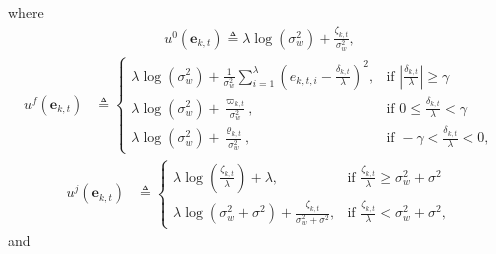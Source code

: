 \documentclass[onecolumn]{IEEEtran}
\begin{document}
where
\begin{gather}\label{eq:u0_rrr}
u^0(\mathbf{e}_{k,t}) \triangleq  \lambda \log(\sigma_w^2) + \frac{\zeta_{k,t}}{\sigma_w^2},
\end{gather}
\begin{align} \label{eq:uf_rrr}
u^f(\mathbf{e}_{k,t}) &\triangleq \begin{cases}
  \lambda \log(\sigma_w^2) + \frac{1}{\sigma_w^2} \sum_{i=1}^{\lambda} (e_{k,t,i} - \frac{\delta_{k,t}}{\lambda})^2 , & \mbox{if } |\frac{\delta_{k,t}}{\lambda}| \geq \gamma \\
  \lambda \log(\sigma_w^2) + \frac{\varpi_{k,t}}{\sigma_w^2}, & \mbox{if } 0 \leq \frac{\delta_{k,t}}{\lambda} < \gamma \\
  \lambda \log(\sigma_w^2) + \frac{\varrho_{k,t}}{\sigma_w^2}, & \mbox{if } -\gamma < \frac{\delta_{k,t}}{\lambda} < 0,
\end{cases}
\end{align}
\begin{align} \label{eq:uj_rrr}
u^j(\mathbf{e}_{k,t}) &\triangleq \begin{cases}
  \lambda \log(\frac{\zeta_{k,t}}{\lambda}) + \lambda, & \mbox{if } \frac{\zeta_{k,t}}{\lambda} \geq \sigma_w^2 + \sigma^2 \\
  \lambda \log(\sigma_w^2 + \sigma^2) + \frac{\zeta_{k,t}}{\sigma_w^2 + \sigma^2}, & \mbox{if } \frac{\zeta_{k,t}}{\lambda} < \sigma_w^2 + \sigma^2,
\end{cases}
\end{align}
and
\end{document}
